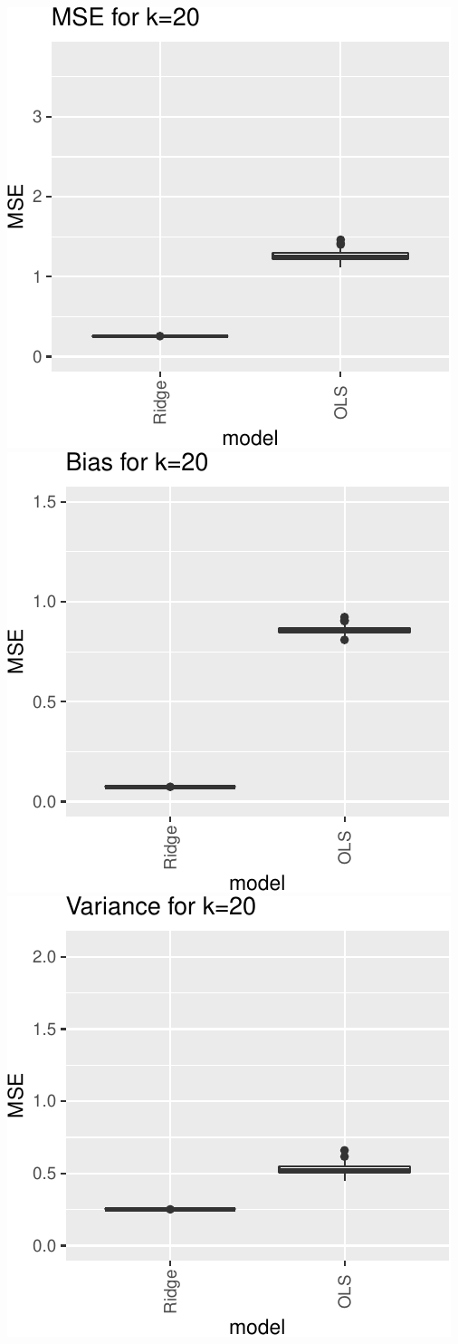 \documentclass[
]{article}
\begin{document}
\includegraphics[width=0.8\linewidth]{report_files/figure-latex/unnamed-chunk-3-1}
\includegraphics[width=0.8\linewidth]{report_files/figure-latex/unnamed-chunk-3-2}
\includegraphics[width=0.8\linewidth]{report_files/figure-latex/unnamed-chunk-3-3}
\end{document}
